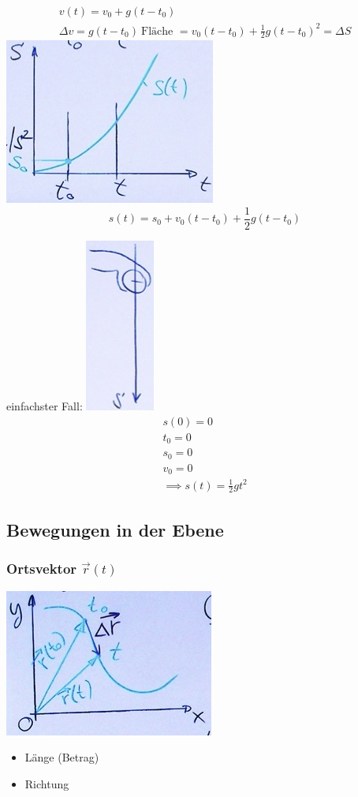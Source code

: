\begin{bsp*}[note = Der freie Fall]
\begin{gather*}
		v(t) = v_0 + g( t - t_0 ) \\
		\Delta v = g( t - t_0 ) \
		\text{Fläche } = v_0 ( t - t_0 ) + \frac{1}{2} g( t - t_0 )^2 = \Delta S
	\end{gather*}
	\includegraphics{Bild11}
	\[ s(t) = s_0 + v_0 ( t - t_0 ) + \frac{1}{2} g( t - t_0 ) \]
	
	einfachster Fall:
	\includegraphics{Bild12}
	\begin{gather*}
		s(0) = 0 \\
		t_0 = 0 \\
		s_0 = 0 \\
		v_0 = 0 \\
		\implies s(t) = \frac{1}{2} gt^2
	\end{gather*}
\end{bsp*}

\subsection{Bewegungen in der Ebene}
\subsubsection{Ortsvektor \texorpdfstring{$\vec{r}(t)$}{r(t)}}
\includegraphics{Bild13}
\begin{itemize}[label = $\rightarrow$]
	\item Länge (Betrag)
	\item Richtung
\end{itemize}


